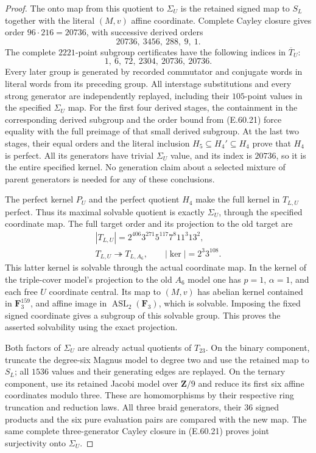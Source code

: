 \begin{proof}
The onto map from this quotient to $\Sigma_U$ is
the retained signed map to $S_L$ together with
the literal $(M,v)$ affine coordinate.
Complete Cayley closure gives order
$96\cdot216=20736$, with successive derived orders
\[
                     20736,\ 3456,\ 288,\ 9,\ 1.
 \tag{E.60.21}
\]
The complete $2221$-point subgroup certificates have
the following indices in $\overline T_U$:
\[
                         1,\ 6,\ 72,\ 2304,\ 20736,\ 20736.
 \tag{E.60.22}
\]
Every later group is generated by recorded commutator
and conjugate words in literal words from its preceding
group. All interstage substitutions and every strong
generator are independently replayed, including their
$105$-point values in the specified $\Sigma_U$ map.
For the first four derived stages, the containment
in the corresponding derived subgroup and the order
bound from \textup{(E.60.21)} force equality with the
full preimage of that small derived subgroup.
At the last two stages, their equal orders and the
literal inclusion $H_5\subseteq H_4'\subseteq H_4$
prove that $H_4$ is perfect. All its generators have
trivial $\Sigma_U$ value, and its index is $20736$,
so it is the entire specified kernel. No generation
claim about a selected mixture of parent generators
is needed for any of these conclusions.

The perfect kernel $P_U$ and the perfect quotient
$H_4$ make the full kernel in $T_{L,U}$ perfect.
Thus its maximal solvable quotient is exactly
$\Sigma_U$, through the specified coordinate map.
The full target order and its projection to the old
target are
\[
 \begin{gathered}
 |T_{L,U}|=2^{406}3^{271}5^{117}7^8 11^3 13^2,\\
 T_{L,U}\twoheadrightarrow T_{L,A_6},
 \qquad |\ker|=2^3 3^{108}.
 \end{gathered}
 \tag{E.60.23}
\]
This latter kernel is solvable through the actual
coordinate map. In the kernel of the triple-cover
model's projection to the old $A_6$ model one has
$p=1$, $\alpha=1$, and each free $U$ coordinate
central. Its map to $(M,v)$ has abelian kernel
contained in $\mathbf F_3^{159}$, and affine image
in $\operatorname{ASL}_2(\mathbf F_3)$, which is
solvable. Imposing the fixed signed coordinate
gives a subgroup of this solvable group. This proves
the asserted solvability using the exact projection.

Both factors of $\Sigma_U$ are already actual
quotients of $T_{23}$. On the binary component,
truncate the degree-six Magnus model to degree two
and use the retained map to $S_L$; all $1536$ values
and their generating edges are replayed. On the
ternary component, use its retained Jacobi model
over $\mathbf Z/9$ and reduce its first six affine
coordinates modulo three. These are homomorphisms
by their respective ring truncation and reduction
laws. All three braid generators, their $36$ signed
products and the six pure evaluation pairs are
compared with the new map. The same complete
three-generator Cayley closure in
\textup{(E.60.21)} proves joint surjectivity onto
$\Sigma_U$.


\end{proof}
